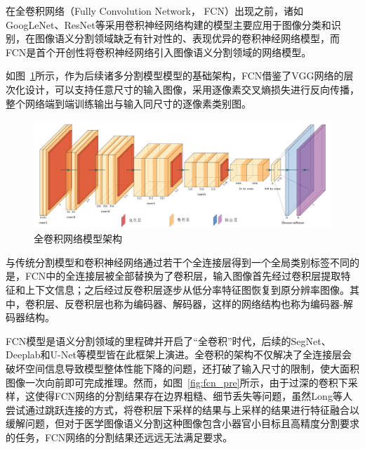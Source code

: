 在全卷积网络（Fully Convolution Network， FCN）出现之前，诸如GoogLeNet、ResNet等采用卷积神经网络构建的模型主要应用于图像分类和识别，在图像语义分割领域缺乏有针对性的、表现优异的卷积神经网络模型，而FCN是首个开创性将卷积神经网络引入图像语义分割领域的网络模型\cite{shelhamer2016}。

如图~\ref{fig:fcn_frame}所示，作为后续诸多分割模型模型的基础架构，FCN借鉴了VGG网络的层次化设计，可以支持任意尺寸的输入图像，采用逐像素交叉熵损失进行反向传播，整个网络端到端训练输出与输入同尺寸的逐像素类别图。

\begin{figure}[htbp]
    \centering
    \includegraphics[width=\textwidth]{fig/fcn_frame.png}
    \caption{全卷积网络模型架构}
    \label{fig:fcn_frame}
\end{figure}

与传统分割模型和卷积神经网络通过若干个全连接层得到一个全局类别标签不同的是，FCN中的全连接层被全部替换为了卷积层，输入图像首先经过卷积层提取特征和上下文信息；之后经过反卷积层逐步从低分率特征图恢复到原分辨率图像。其中，卷积层、反卷积层也称为编码器、解码器，这样的网络结构也称为编码器-解码器结构。

FCN模型是语义分割领域的里程碑并开启了“全卷积”时代，后续的SegNet、Deeplab和U-Net等模型皆在此框架上演进。全卷积的架构不仅解决了全连接层会破坏空间信息导致模型整体性能下降的问题，还打破了输入尺寸的限制，使大面积图像一次向前即可完成推理。然而，如图~\ref{fig:fcn_pre}所示，由于过深的卷积下采样，这使得FCN网络的分割结果存在边界粗糙、细节丢失等问题，虽然Long等人尝试通过跳跃连接的方式，将卷积层下采样的结果与上采样的结果进行特征融合以缓解问题，但对于医学图像语义分割这种图像包含小器官小目标且高精度分割要求的任务，FCN网络的分割结果还远远无法满足要求。

